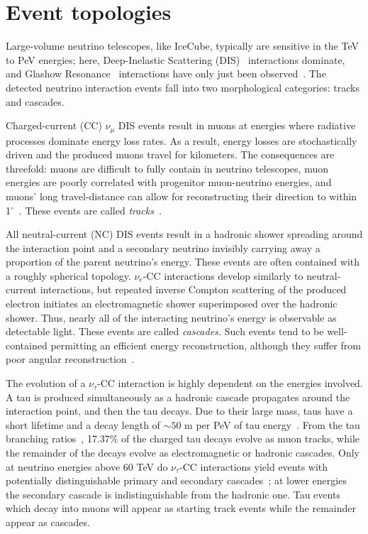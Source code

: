 \documentclass[main.tex]{subfiles}
\begin{document}
\section{Event topologies}\label{sec:event_morphology}

Large-volume neutrino telescopes, like IceCube, typically are sensitive in the TeV to PeV energies; here, Deep-Inelastic Scattering (DIS)~\cite{gandhineutrinos} interactions dominate, and Glashow Resonance~\cite{PhysRev.118.316} interactions have only just been observed~\cite{IceCube:2021rpz}.
The detected neutrino interaction events fall into two morphological categories: tracks and cascades.

Charged-current (CC) $\nu_{\mu}$ DIS events result in muons at energies where radiative processes dominate energy loss rates.
As a result, energy losses are stochastically driven and the produced muons travel for kilometers. 
The consequences are threefold: muons are difficult to fully contain in neutrino telescopes, muon energies are poorly correlated with progenitor muon-neutrino energies, and muons' long travel-distance can allow for reconstructing their direction to within 1$^{\circ}$~\cite{trackaccuracy2017}. These events are called \textit{tracks}~\cite{icecube_energy_reco}.

All neutral-current (NC) DIS events result in a hadronic shower spreading around the interaction point and a secondary neutrino invisibly carrying away a proportion of the parent neutrino's energy. 
These events are often contained with a roughly spherical topology. 
$\nu_{e}$-CC interactions develop similarly to neutral-current interactions, but repeated inverse Compton scattering of the produced electron initiates an electromagnetic shower superimposed over the hadronic shower. 
Thus, nearly all of the interacting neutrino's energy is observable as detectable light. 
These events are called \textit{cascades.} Such events tend to be well-contained permitting an efficient energy reconstruction, although they suffer from poor angular reconstruction~\cite{icecube_energy_reco}. 

The evolution of a $\nu_{\tau}$-CC interaction is highly dependent on the energies involved. A tau is produced simultaneously as a hadronic cascade propagates around the interaction point, and then the tau decays. 
Due to their large mass, taus have a short lifetime and a decay length of $\sim 50$ m per PeV of tau energy~\cite{abbasi2020measurement}. 
From the tau branching ratios~\cite{PhysRevD.98.030001}, 17.37\% of the charged tau decays evolve as muon tracks, while the remainder of the decays evolve as electromagnetic or hadronic cascades. Only at neutrino energies above 60 TeV do $\nu_{\tau}$-CC interactions yield events with potentially distinguishable primary and secondary cascades~\cite{abbasi2020measurement}; at lower energies the secondary cascade is indistinguishable from the hadronic one. Tau events which decay into muons will appear as starting track events while the remainder appear as cascades. 
\end{document}
